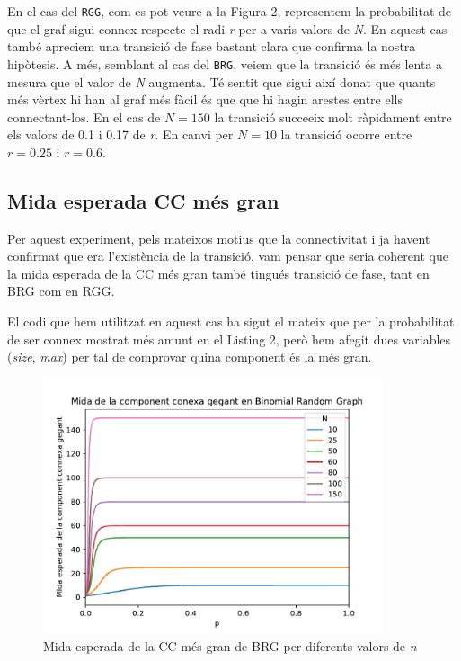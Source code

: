 En el cas del \texttt{RGG}, com es pot veure a la Figura 2, representem la probabilitat de que el graf sigui connex respecte el radi \emph{r} per a varis valors de \emph{N}. En aquest cas també apreciem una transició de fase bastant clara que confirma la nostra hipòtesis. A més, semblant al cas del \texttt{BRG}, veiem que la transició és més lenta a mesura que el valor de \emph{N} augmenta. Té sentit que sigui així donat que quants més vèrtex hi han al graf més fàcil és que que hi hagin arestes entre ells connectant-los. En el cas de $N=150$ la transició succeeix molt ràpidament entre els valors de 0.1 i 0.17 de \emph{r}. En canvi per $N=10$ la transició ocorre entre $r=0.25$ i $r=0.6$.


\subsection{Mida esperada CC més gran}
Per aquest experiment, pels mateixos motius que la connectivitat i ja havent confirmat que era l'existència de la transició, vam pensar que seria coherent que la mida esperada de la CC més gran també tingués transició de fase, tant en BRG com en RGG.

El codi que hem utilitzat en aquest cas ha sigut el mateix que per la probabilitat de ser connex mostrat més amunt en el Listing 2, però hem afegit dues variables (\textit{size}, \textit{max}) per tal de comprovar quina component és la més gran.

\begin{figure}[H]
    \centering
    \includegraphics[width=10cm]{plots/BRG_midaCompConMax.pdf}
    \caption{Mida esperada de la CC més gran de BRG per diferents valors de \textit{n}}
    \label{fig:connect_04}
\end{figure}

